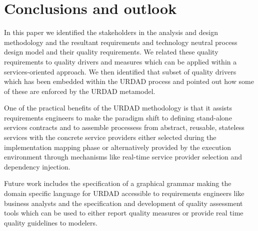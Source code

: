 \section{Conclusions and outlook}

In this paper we identified the stakeholders in the analysis and design methodology and the resultant requirements and technology neutral process design model and their quality requirements. We related these quality requirements to quality drivers and measures which can be applied within a services-oriented approach. We then identified that subset of quality drivers which has been embedded within the URDAD process and pointed out how some of these are enforced by the URDAD metamodel.

One of the practical benefits of the URDAD methodology is that it assists requirements engineers to make the paradigm shift\cite{haines_impact_2007} to defining stand-alone services contracts and to assemble processess from abstract, reusable, stateless services with the concrete service providers either selected during the implementation mapping phase or alternatively provided by the execution environment through mechanisms like real-time service provider selection and dependency injection.

Future work includes the specification of a graphical grammar making the domain specific language for URDAD accessible to requirements engineers like business analysts and the specification and development of quality assessment tools which can be used to either report quality measures or provide real time quality guidelines to modelers.